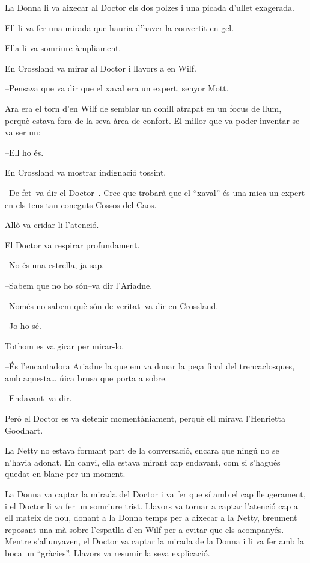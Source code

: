 La Donna li va aixecar al Doctor els dos polzes i una picada d'ullet
exagerada.

Ell li va fer una mirada que hauria d'haver-la convertit en gel.

Ella li va somriure àmpliament.

En Crossland va mirar al Doctor i llavors a en Wilf.

--Pensava que va dir que el xaval era un expert, senyor Mott.

Ara era el torn d'en Wilf de semblar un conill atrapat en un focus de
llum, perquè estava fora de la seva àrea de confort. El millor que va
poder inventar-se va ser un:

--Ell ho és.

En Crossland va mostrar indignació tossint.

--De fet--va dir el Doctor--. Crec que trobarà que el ``xaval'' és una
mica un expert en els teus tan coneguts Cossos del Caos.

Allò va cridar-li l'atenció.

El Doctor va respirar profundament.

--No és una estrella, ja sap.

--Sabem que no ho són--va dir l'Ariadne.

--Només no sabem què són de veritat--va dir en Crossland.

--Jo ho sé.

Tothom es va girar per mirar-lo.

--És l'encantadora Ariadne la que em va donar la peça final del
trencaclosques, amb aquesta\ldots{} úica brusa que porta a sobre.

--Endavant--va dir.

Però el Doctor es va detenir momentàniament, perquè ell mirava
l'Henrietta Goodhart.

La Netty no estava formant part de la conversació, encara que ningú no
se n'havia adonat. En canvi, ella estava mirant cap endavant, com si
s'hagués quedat en blanc per un moment.

La Donna va captar la mirada del Doctor i va fer que sí amb el cap
lleugerament, i el Doctor li va fer un somriure trist. Llavors va tornar
a captar l'atenció cap a ell mateix de nou, donant a la Donna temps per
a aixecar a la Netty, breument reposant una mà sobre l'espatlla d'en
Wilf per a evitar que els acompanyés. Mentre s'allunyaven, el Doctor va
captar la mirada de la Donna i li va fer amb la boca un ``gràcies''.
Llavors va resumir la seva explicació.

